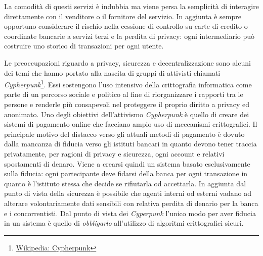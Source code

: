 La comodità di questi servizi è indubbia ma viene persa la semplicità di interagire direttamente con il venditore o il fornitore del servizio. In aggiunta è sempre opportuno considerare il rischio nella cessione di controllo su carte di credito o coordinate bancarie a servizi terzi e la perdita di privacy: ogni intermediario può costruire uno storico di transazioni per ogni utente.

Le preoccupazioni riguardo a privacy, sicurezza e decentralizzazione sono alcuni dei temi che hanno portato alla nascita di gruppi di attivisti chiamati \textit{Cypherpunk}\footnote{\href{https://it.wikipedia.org/wiki/Cypherpunk}{Wikipedia: Cypherpunk}}. Essi sostengono l'uso intensivo della crittografia informatica come parte di un percorso sociale e politico al fine di riorganizzare i rapporti tra le persone e renderle più consapevoli nel proteggere il proprio diritto a privacy ed anonimato.\newline\newline
Uno degli obiettivi dell'attivismo \textit{Cypherpunk} è quello di creare dei sistemi di pagamento online che facciano ampio uso di meccanismi crittografici. Il principale motivo del distacco verso gli attuali metodi di pagamento è dovuto dalla mancanza di fiducia verso gli istituti bancari in quanto devono tener traccia privatamente, per ragioni di privacy e sicurezza, ogni account e relativi spostamenti di denaro. Viene a crearsi quindi un sistema basato esclusivamente sulla fiducia: ogni partecipante deve fidarsi della banca per ogni transazione in quanto è l'istituto stessa che decide se rifiutarla od accettarla. In aggiunta dal punto di vista della sicurezza è possibile che agenti interni od esterni vadano ad alterare volontariamente dati sensibili con relativa perdita di denario per la banca e i concorrentisti. Dal punto di vista dei \textit{Cyperpunk} l'unico modo per aver fiducia in un sistema è quello di \textit{obbligarlo} all'utilizzo di algoritmi crittografici sicuri.\newline\newline
